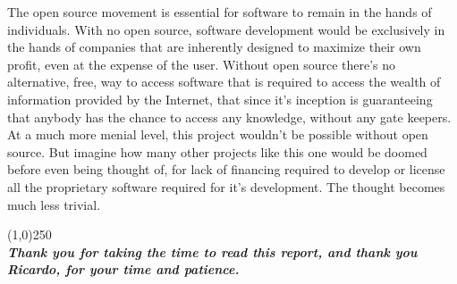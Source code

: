 The open source movement is essential for software to remain in the hands of individuals. With no open source, software 
development would be exclusively in the hands of companies that are inherently designed to maximize their own profit, even 
at the expense of the user. Without open source there's no alternative, free, way to access software that is required to 
access the wealth of information provided by the Internet, that since it's inception is guaranteeing that anybody has the 
chance to access any knowledge, without any gate keepers.\\

At a much more menial level, this project wouldn't be possible without open source. But imagine how many other projects 
like this one would be doomed before even being thought of, for lack of financing required to develop or license all the 
proprietary software required for it's development. The thought becomes much less trivial.\\
\begin{center}
\vfill
\line(1,0){250}\\
\textit{\textbf{Thank you for taking the time to read this report, and thank you Ricardo, for your time and patience.}}
\end{center}
